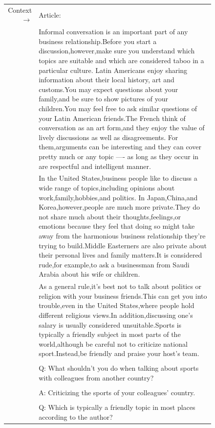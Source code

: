 \documentclass{article}
\begin{document}
\begin{figure}[!h] { \tt \footnotesize \begin{tabularx}{\linewidth}{r X} \toprule Context $\to$ & Article: \\
 & Informal conversation is an important part of any business relationship.Before you start a discussion,however,make sure you understand which topics are suitable and which are considered taboo in a particular culture. Latin Americans enjoy sharing information about their local history, art and customs.You may expect questions about your family,and be sure to show pictures of your children.You may feel free to ask similar questions of your Latin American friends.The French think of conversation as an art form,and they enjoy the value of lively discussions as well as disagreements. For them,arguments can be interesting and they can cover pretty much or any topic ---- as long as they occur in are respectful and intelligent manner. \\ 
 & In the United States,business people like to discuss a wide range of topics,including opinions about work,family,hobbies,and politics. In Japan,China,and Korea,however,people are much more private.They do not share much about their thoughts,feelings,or emotions because they feel that doing so might take away from the harmonious business relationship they're trying to build.Middle Easterners are also private about their personal lives and family matters.It is considered rude,for example,to ask a businessman from Saudi Arabia about his wife or children. \\ 
 & As a general rule,it's best not to talk about politics or religion with your business friends.This can get you into trouble,even in the United States,where people hold different religious views.In addition,discussing one's salary is usually considered unsuitable.Sports is typically a friendly subject in most parts of the world,although be careful not to criticize national sport.Instead,be friendly and praise your host's team. \\ 
 &  \\ 
 & Q: What shouldn't you do when talking about sports with colleagues from another country? \\ 
 &  \\ 
 & A: Criticizing the sports of your colleagues' country. \\ 
 &  \\ 
 & Q: Which is typically a friendly topic in most places according to the author? \\ 

\end{tabularx}}
\end{figure}
\end{document}
